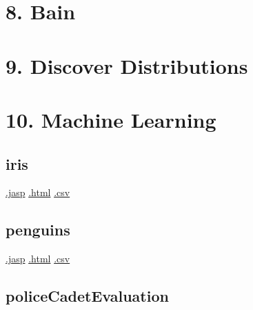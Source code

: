\documentclass[
  letterpaper,
  DIV=11,
  numbers=noendperiod]{scrreprt}
\begin{document}

\hypertarget{bain}{%
\chapter{8. Bain}\label{bain}}


\hypertarget{discover-distributions}{%
\chapter{9. Discover Distributions}\label{discover-distributions}}


\hypertarget{machine-learning}{%
\chapter{10. Machine Learning}\label{machine-learning}}

\hypertarget{iris}{%
\section{iris}\label{iris}}

\textbar{}
\href{https://github.com/jasp-stats/jasp-data-library/raw/main/iris/iris.jasp}{.jasp}
\textbar{}
\href{https://htmlpreview.github.io/?https://github.com/jasp-stats/jasp-data-library/blob/main/iris/index.html}{.html}
\textbar{}
\href{https://raw.githubusercontent.com/jasp-stats/jasp-data-library/main/iris/iris.csv}{.csv}

\hypertarget{penguins}{%
\section{penguins}\label{penguins}}

\textbar{}
\href{https://github.com/jasp-stats/jasp-data-library/raw/main/penguins/penguins.jasp}{.jasp}
\textbar{}
\href{https://htmlpreview.github.io/?https://github.com/jasp-stats/jasp-data-library/blob/main/penguins/index.html}{.html}
\textbar{}
\href{https://raw.githubusercontent.com/jasp-stats/jasp-data-library/main/penguins/penguins.csv}{.csv}

\hypertarget{policecadetevaluation}{%
\section{policeCadetEvaluation}\label{policecadetevaluation}}
\end{document}
